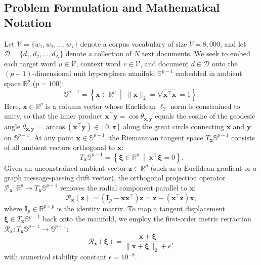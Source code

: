 \documentclass[journal]{IEEEtran}
\begin{document}
\subsection{Problem Formulation and Mathematical Notation}
Let $\mathcal{V} = \{w_1, w_2, \dots, w_V\}$ denote a corpus vocabulary of size $V = 8,000$, and let $\mathcal{D} = \{d_1, d_2, \dots, d_N\}$ denote a collection of $N$ text documents. We seek to embed each target word $u \in \mathcal{V}$, context word $v \in \mathcal{V}$, and document $d \in \mathcal{D}$ onto the $(p-1)$-dimensional unit hypersphere manifold $\mathbb{S}^{p-1}$ embedded in ambient space $\mathbb{R}^p$ ($p = 100$):
\begin{equation}
\mathbb{S}^{p-1} = \left\{ \mathbf{x} \in \mathbb{R}^p \;\middle|\; \|\mathbf{x}\|_2 = \sqrt{\mathbf{x}^\top \mathbf{x}} = 1 \right\}.
\label{eq:sphere_def}
\end{equation}
Here, $\mathbf{x} \in \mathbb{R}^p$ is a column vector whose Euclidean $\ell_2$ norm is constrained to unity, so that the inner product $\mathbf{x}^\top \mathbf{y} = \cos\theta_{\mathbf{x},\mathbf{y}}$ equals the cosine of the geodesic angle $\theta_{\mathbf{x},\mathbf{y}} = \arccos(\mathbf{x}^\top \mathbf{y}) \in [0, \pi]$ along the great circle connecting $\mathbf{x}$ and $\mathbf{y}$ on $\mathbb{S}^{p-1}$. At any point $\mathbf{x} \in \mathbb{S}^{p-1}$, the Riemannian tangent space $T_{\mathbf{x}}\mathbb{S}^{p-1}$ consists of all ambient vectors orthogonal to $\mathbf{x}$:
\begin{equation}
T_{\mathbf{x}}\mathbb{S}^{p-1} = \left\{ \boldsymbol{\xi} \in \mathbb{R}^p \;\middle|\; \mathbf{x}^\top \boldsymbol{\xi} = 0 \right\}.
\label{eq:tangent_space}
\end{equation}
Given an unconstrained ambient vector $\mathbf{z} \in \mathbb{R}^p$ (such as a Euclidean gradient or a graph message-passing drift vector), the orthogonal projection operator $\mathcal{P}_{\mathbf{x}}: \mathbb{R}^p \to T_{\mathbf{x}}\mathbb{S}^{p-1}$ removes the radial component parallel to $\mathbf{x}$:
\begin{equation}
\mathcal{P}_{\mathbf{x}}(\mathbf{z}) = \left(\mathbf{I}_p - \mathbf{x}\mathbf{x}^\top\right)\mathbf{z} = \mathbf{z} - (\mathbf{x}^\top \mathbf{z})\mathbf{x},
\label{eq:tangent_proj}
\end{equation}
where $\mathbf{I}_p \in \mathbb{R}^{p \times p}$ is the identity matrix. To map a tangent displacement $\boldsymbol{\xi} \in T_{\mathbf{x}}\mathbb{S}^{p-1}$ back onto the manifold, we employ the first-order metric retraction $\mathcal{R}_{\mathbf{x}}: T_{\mathbf{x}}\mathbb{S}^{p-1} \to \mathbb{S}^{p-1}$:
\begin{equation}
\mathcal{R}_{\mathbf{x}}(\boldsymbol{\xi}) = \frac{\mathbf{x} + \boldsymbol{\xi}}{\|\mathbf{x} + \boldsymbol{\xi}\|_2 + \epsilon},
\label{eq:retraction}
\end{equation}
with numerical stability constant $\epsilon = 10^{-8}$.
\end{document}
